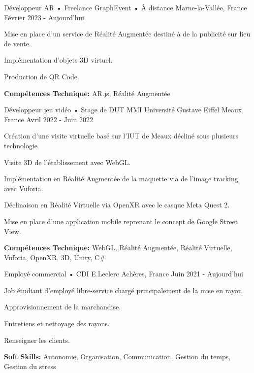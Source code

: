 \begin{cventries}
    \cventry
    {Développeur AR • Freelance} %
    {GraphEvent • À distance} %
    {Marne-la-Vallée, France} %
    {Février 2023 - Aujourd'hui} %
    {
      \begin{cvitems} %
        \item {Mise en place d'un service de Réalité Augmentée destiné à de la publicité sur lieu de vente.}
        \item {Implémentation d'objets 3D virtuel.}
        \item{Production de QR Code.}
        \item {\textbf{Compétences Technique:} AR.js, Réalité Augmentée}
      \end{cvitems}
    }
    \cventry
    {Développeur jeu vidéo • Stage de DUT MMI} %
    {Université Gustave Eiffel} %
    {Meaux, France} %
    {Avril 2022 - Juin 2022} %
    {
      \begin{cvitems} %
        \item {Création d'une visite virtuelle basé sur l'IUT de Meaux décliné sous plusieurs technologie.}
        \item {Visite 3D de l'établissement avec WebGL.}
        \item {Implémentation en Réalité Augmentée de la maquette via de l'image tracking avec Vuforia.}
        \item {Déclinaison en Réalité Virtuelle via OpenXR avec le casque Meta Quest 2.}
        \item {Mise en place d'une application mobile reprenant le concept de Google Street View.}
        \item {\textbf{Compétences Technique:} WebGL, Réalité Augmentée, Réalité Virtuelle, Vuforia, OpenXR, 3D, Unity, C\#}
      \end{cvitems}
    }
    \cventry
    {Employé commercial • CDI} %
    {E.Leclerc} %
    {Achères, France} %
    {Juin 2021 - Aujourd'hui} %
    {
      \begin{cvitems} %
        \item {Job étudiant d'employé libre-service chargé principalement de la mise en rayon.}
        \item{Approvisionnement de la marchandise.}
        \item {Entretiens et nettoyage des rayons.}
        \item {Renseigner les clients.}
        \item {\textbf{Soft Skills:} Autonomie, Organisation, Communication, Gestion du temps, Gestion du stress} \\\\
      \end{cvitems}
    }

\end{cventries}
